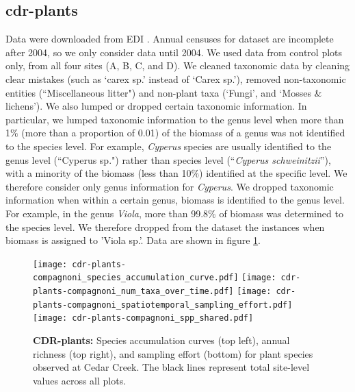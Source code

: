 \documentclass[11pt, oneside]{article}
\begin{document}
\subsection {cdr-plants}
Data were downloaded from EDI \citep{cdr-plants}.
Annual censuses for dataset are incomplete after 2004, so we only consider data until 2004. We used data from control plots only, from all four sites (A, B, C, and D). 
We cleaned taxonomic data by cleaning clear mistakes (such as `carex sp.' instead of `Carex sp.'), removed non-taxonomic entities (``Miscellaneous litter") and non-plant taxa (`Fungi', and `Mosses \& lichens').
We also lumped or dropped certain taxonomic information. 
In particular, we lumped taxonomic information to the genus level when more than 1$\%$ (more than a proportion of 0.01) of the biomass of a genus was not identified to the species level. 
For example, {\it Cyperus} species are usually identified to the genus level (``Cyperus  sp.") rather than species level (``{\it Cyperus schweinitzii}''), with a minority of the biomass (less than 10$\%$) identified at the specific level. We therefore consider only genus information for {\it Cyperus}. 
We dropped taxonomic information when within a certain genus, biomass is identified to the genus level. 
For example, in the genus {\it Viola}, more than 99.8$\%$ of biomass was determined to the species level. We therefore dropped from the dataset the instances when biomass is assigned to 'Viola sp.'.
Data are shown in figure \ref{cdr-plants}.

\begin{figure}[h!]
\centering
\texttt{[image: cdr-plants-compagnoni\_species\_accumulation\_curve.pdf]}
\texttt{[image: cdr-plants-compagnoni\_num\_taxa\_over\_time.pdf]}
\texttt{[image: cdr-plants-compagnoni\_spatiotemporal\_sampling\_effort.pdf]}
\texttt{[image: cdr-plants-compagnoni\_spp\_shared.pdf]}
\caption{{\bf CDR-plants:} Species accumulation curves (top left),  annual richness (top right), and sampling effort (bottom)  for plant species observed at Cedar Creek. The black lines represent total site-level values across all plots.}
\label{cdr-plants}
\end{figure}
\end{document}

